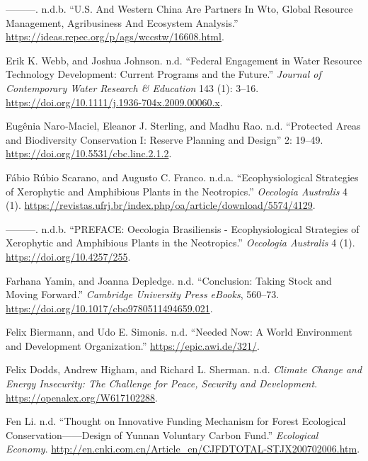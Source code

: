 \begin{CSLReferences}{1}{0}
---------. n.d.b. {``U.S. And Western China Are Partners In Wto, Global
Resource Management, Agribusiness And Ecosystem Analysis.''}
\url{https://ideas.repec.org/p/ags/wccstw/16608.html}.

Erik K. Webb, and Joshua Johnson. n.d. {``Federal Engagement in Water
Resource Technology Development: Current Programs and the Future.''}
\emph{Journal of Contemporary Water Research \& Education} 143 (1):
3--16. \url{https://doi.org/10.1111/j.1936-704x.2009.00060.x}.

Eugênia Naro‐Maciel, Eleanor J. Sterling, and Madhu Rao. n.d.
{``Protected Areas and Biodiversity Conservation I: Reserve Planning and
Design''} 2: 19--49. \url{https://doi.org/10.5531/cbc.linc.2.1.2}.

Fábio Rúbio Scarano, and Augusto C. Franco. n.d.a. {``Ecophysiological
Strategies of Xerophytic and Amphibious Plants in the Neotropics.''}
\emph{Oecologia Australis} 4 (1).
\url{https://revistas.ufrj.br/index.php/oa/article/download/5574/4129}.

---------. n.d.b. {``PREFACE: Oecologia Brasiliensis - Ecophysiological
Strategies of Xerophytic and Amphibious Plants in the Neotropics.''}
\emph{Oecologia Australis} 4 (1). \url{https://doi.org/10.4257/255}.

Farhana Yamin, and Joanna Depledge. n.d. {``Conclusion: Taking Stock and
Moving Forward.''} \emph{Cambridge University Press eBooks}, 560--73.
\url{https://doi.org/10.1017/cbo9780511494659.021}.

Felix Biermann, and Udo E. Simonis. n.d. {``Needed Now: A World
Environment and Development Organization.''}
\url{https://epic.awi.de/321/}.

Felix Dodds, Andrew Higham, and Richard L. Sherman. n.d. \emph{Climate
Change and Energy Insecurity: The Challenge for Peace, Security and
Development}. \url{https://openalex.org/W617102288}.

Fen Li. n.d. {``Thought on Innovative Funding Mechanism for Forest
Ecological Conservation------Design of Yunnan Voluntary Carbon Fund.''}
\emph{Ecological Economy}.
\url{http://en.cnki.com.cn/Article_en/CJFDTOTAL-STJX200702006.htm}.


\end{CSLReferences}
